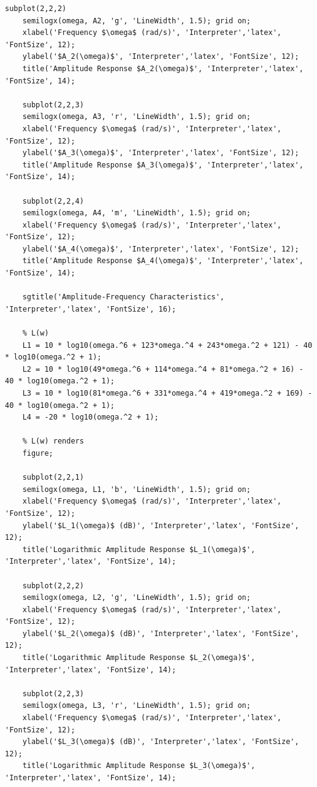 \documentclass[a4paper, 12pt]{article}
\begin{document}
\begin{lstlisting}[label=task1, caption={Программа для задания 1}]
    subplot(2,2,2)
    semilogx(omega, A2, 'g', 'LineWidth', 1.5); grid on;
    xlabel('Frequency $\omega$ (rad/s)', 'Interpreter','latex', 'FontSize', 12);
    ylabel('$A_2(\omega)$', 'Interpreter','latex', 'FontSize', 12);
    title('Amplitude Response $A_2(\omega)$', 'Interpreter','latex', 'FontSize', 14);

    subplot(2,2,3)
    semilogx(omega, A3, 'r', 'LineWidth', 1.5); grid on;
    xlabel('Frequency $\omega$ (rad/s)', 'Interpreter','latex', 'FontSize', 12);
    ylabel('$A_3(\omega)$', 'Interpreter','latex', 'FontSize', 12);
    title('Amplitude Response $A_3(\omega)$', 'Interpreter','latex', 'FontSize', 14);

    subplot(2,2,4)
    semilogx(omega, A4, 'm', 'LineWidth', 1.5); grid on;
    xlabel('Frequency $\omega$ (rad/s)', 'Interpreter','latex', 'FontSize', 12);
    ylabel('$A_4(\omega)$', 'Interpreter','latex', 'FontSize', 12);
    title('Amplitude Response $A_4(\omega)$', 'Interpreter','latex', 'FontSize', 14);

    sgtitle('Amplitude-Frequency Characteristics', 'Interpreter','latex', 'FontSize', 16);

    % L(w)
    L1 = 10 * log10(omega.^6 + 123*omega.^4 + 243*omega.^2 + 121) - 40 * log10(omega.^2 + 1);
    L2 = 10 * log10(49*omega.^6 + 114*omega.^4 + 81*omega.^2 + 16) - 40 * log10(omega.^2 + 1);
    L3 = 10 * log10(81*omega.^6 + 331*omega.^4 + 419*omega.^2 + 169) - 40 * log10(omega.^2 + 1);
    L4 = -20 * log10(omega.^2 + 1);

    % L(w) renders
    figure;

    subplot(2,2,1)
    semilogx(omega, L1, 'b', 'LineWidth', 1.5); grid on;
    xlabel('Frequency $\omega$ (rad/s)', 'Interpreter','latex', 'FontSize', 12);
    ylabel('$L_1(\omega)$ (dB)', 'Interpreter','latex', 'FontSize', 12);
    title('Logarithmic Amplitude Response $L_1(\omega)$', 'Interpreter','latex', 'FontSize', 14);

    subplot(2,2,2)
    semilogx(omega, L2, 'g', 'LineWidth', 1.5); grid on;
    xlabel('Frequency $\omega$ (rad/s)', 'Interpreter','latex', 'FontSize', 12);
    ylabel('$L_2(\omega)$ (dB)', 'Interpreter','latex', 'FontSize', 12);
    title('Logarithmic Amplitude Response $L_2(\omega)$', 'Interpreter','latex', 'FontSize', 14);

    subplot(2,2,3)
    semilogx(omega, L3, 'r', 'LineWidth', 1.5); grid on;
    xlabel('Frequency $\omega$ (rad/s)', 'Interpreter','latex', 'FontSize', 12);
    ylabel('$L_3(\omega)$ (dB)', 'Interpreter','latex', 'FontSize', 12);
    title('Logarithmic Amplitude Response $L_3(\omega)$', 'Interpreter','latex', 'FontSize', 14);


\end{lstlisting}
\end{document}
